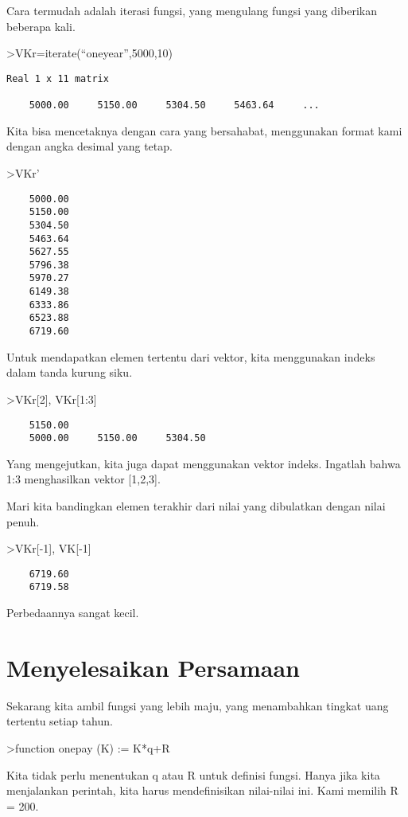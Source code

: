 \documentclass[
]{book}
\begin{document}
Cara termudah adalah iterasi fungsi, yang mengulang fungsi yang diberikan beberapa kali.

\textgreater VKr=iterate(``oneyear'',5000,10)

\begin{verbatim}
Real 1 x 11 matrix

    5000.00     5150.00     5304.50     5463.64     ...
\end{verbatim}

Kita bisa mencetaknya dengan cara yang bersahabat, menggunakan format kami dengan angka desimal yang tetap.

\textgreater VKr'

\begin{verbatim}
    5000.00 
    5150.00 
    5304.50 
    5463.64 
    5627.55 
    5796.38 
    5970.27 
    6149.38 
    6333.86 
    6523.88 
    6719.60 
\end{verbatim}

Untuk mendapatkan elemen tertentu dari vektor, kita menggunakan indeks dalam tanda kurung siku.

\textgreater VKr{[}2{]}, VKr{[}1:3{]}

\begin{verbatim}
    5150.00 
    5000.00     5150.00     5304.50 
\end{verbatim}

Yang mengejutkan, kita juga dapat menggunakan vektor indeks. Ingatlah bahwa 1:3 menghasilkan vektor {[}1,2,3{]}.

Mari kita bandingkan elemen terakhir dari nilai yang dibulatkan dengan nilai penuh.

\textgreater VKr{[}-1{]}, VK{[}-1{]}

\begin{verbatim}
    6719.60 
    6719.58 
\end{verbatim}

Perbedaannya sangat kecil.

\chapter{Menyelesaikan Persamaan}\label{menyelesaikan-persamaan}

Sekarang kita ambil fungsi yang lebih maju, yang menambahkan tingkat uang tertentu setiap tahun.

\textgreater function onepay (K) := K*q+R

Kita tidak perlu menentukan q atau R untuk definisi fungsi. Hanya jika kita menjalankan perintah, kita harus mendefinisikan nilai-nilai ini. Kami memilih R = 200.
\end{document}
